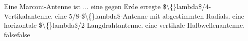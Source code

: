     {Eine Marconi-Antenne ist ...}
    {eine gegen Erde erregte \$\textbackslash\{\}lambda\$/4-Vertikalantenne.}
    {eine 5/8-\$\textbackslash\{\}lambda\$-Antenne mit abgestimmten Radials.}
    {eine horizontale \$\textbackslash\{\}lambda\$/2-Langdrahtantenne.}
    {eine vertikale Halbwellenantenne.}
    {false}{false}